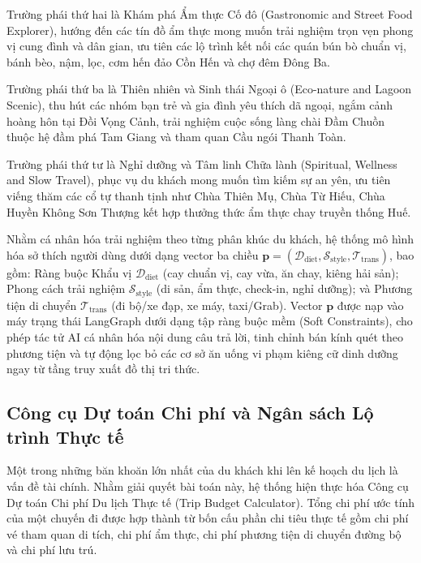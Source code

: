 Trường phái thứ hai là Khám phá Ẩm thực Cố đô (Gastronomic and Street Food Explorer), hướng đến các tín đồ ẩm thực mong muốn trải nghiệm trọn vẹn phong vị cung đình và dân gian, ưu tiên các lộ trình kết nối các quán bún bò chuẩn vị, bánh bèo, nậm, lọc, cơm hến đảo Cồn Hến và chợ đêm Đông Ba.

Trường phái thứ ba là Thiên nhiên và Sinh thái Ngoại ô (Eco-nature and Lagoon Scenic), thu hút các nhóm bạn trẻ và gia đình yêu thích dã ngoại, ngắm cảnh hoàng hôn tại Đồi Vọng Cảnh, trải nghiệm cuộc sống làng chài Đầm Chuồn thuộc hệ đầm phá Tam Giang và tham quan Cầu ngói Thanh Toàn.

Trường phái thứ tư là Nghỉ dưỡng và Tâm linh Chữa lành (Spiritual, Wellness and Slow Travel), phục vụ du khách mong muốn tìm kiếm sự an yên, ưu tiên viếng thăm các cổ tự thanh tịnh như Chùa Thiên Mụ, Chùa Từ Hiếu, Chùa Huyền Không Sơn Thượng kết hợp thưởng thức ẩm thực chay truyền thống Huế.

Nhằm cá nhân hóa trải nghiệm theo từng phân khúc du khách, hệ thống mô hình hóa sở thích người dùng dưới dạng vector ba chiều $\mathbf{p} = (\mathcal{D}_{\text{diet}}, \mathcal{S}_{\text{style}}, \mathcal{T}_{\text{trans}})$, bao gồm: Ràng buộc Khẩu vị $\mathcal{D}_{\text{diet}}$ (cay chuẩn vị, cay vừa, ăn chay, kiêng hải sản); Phong cách trải nghiệm $\mathcal{S}_{\text{style}}$ (di sản, ẩm thực, check-in, nghỉ dưỡng); và Phương tiện di chuyển $\mathcal{T}_{\text{trans}}$ (đi bộ/xe đạp, xe máy, taxi/Grab). Vector $\mathbf{p}$ được nạp vào máy trạng thái LangGraph dưới dạng tập ràng buộc mềm (Soft Constraints), cho phép tác tử AI cá nhân hóa nội dung câu trả lời, tinh chỉnh bán kính quét theo phương tiện và tự động lọc bỏ các cơ sở ăn uống vi phạm kiêng cữ dinh dưỡng ngay từ tầng truy xuất đồ thị tri thức.

\subsection{Công cụ Dự toán Chi phí và Ngân sách Lộ trình Thực tế}
\label{subsec:ch1-budget-calculator}

Một trong những băn khoăn lớn nhất của du khách khi lên kế hoạch du lịch là vấn đề tài chính. Nhằm giải quyết bài toán này, hệ thống hiện thực hóa Công cụ Dự toán Chi phí Du lịch Thực tế (Trip Budget Calculator). Tổng chi phí ước tính của một chuyến đi được hợp thành từ bốn cấu phần chi tiêu thực tế gồm chi phí vé tham quan di tích, chi phí ẩm thực, chi phí phương tiện di chuyển đường bộ và chi phí lưu trú.


